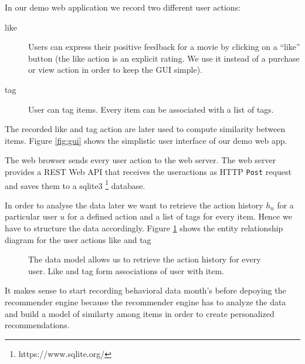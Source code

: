 In our demo web application we record two different user actions:
\begin{description}
\item[like]  Users can express their positive feedback for a movie by clicking on a ``like'' button (the \gls{like} action is an explicit rating. We use it instead of a purchase or view action in order to keep the GUI simple).
\item[tag] User can \gls{tag} items. Every item can be associated with a list of \glspl{tag}.
\end{description}
The recorded like and tag action are later used to compute similarity between items.
Figure \ref{fig:gui} shows the simplistic user interface of our demo web app.

The web browser sends every user action to the web server. The web server provides a REST Web API that receives the \glspl{useraction} as HTTP \verb|Post| request and saves them to a sqlite3 \footnote{https://www.sqlite.org/} database.

In order to analyse the data later we want to retrieve the action history $h_u$ for a particular user $u$ for a defined action and a list of tags for every item. Hence we have to structure the data accordingly. Figure \ref{fig:er} shows the entity relationship diagram for the user actions \gls{like} and \gls{tag}


\begin{figure}
\centering
{}
\caption{The data model allows us to retrieve the action history for every user. Like and tag form associations of user with item.}
\label{fig:er}
\end{figure}

It makes sense to start recording behavioral data month's before depoying the recommender engine because the recommender engine has to analyze the data and build a model of similarty among items in order to create personalized recommendations.

